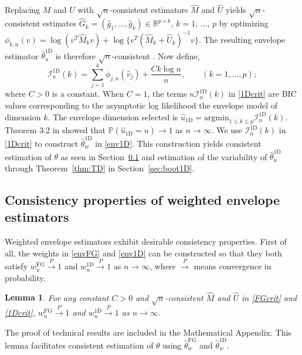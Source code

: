 \documentclass{article}\usepackage[]{graphicx}\usepackage[]{color}
\newcommand{\R}{\mathbb{R}}
\newcommand{\Prob}{\mathbb{P}}
\newcommand{\Mhat}{\widehat{M}}
\newcommand{\Uhat}{\widehat{U}}
\newcommand{\TD}{\widehat{\theta}^{\text{1D}}}
\newcommand{\Ghat}{\widehat{G}}
\newcommand{\ghat}{\widehat{g}}
\newcommand{\rootn}{\sqrt{n}}
\newcommand{\EnvwFG}{\widehat{\theta}^{\text{FG}}_w}
\newcommand{\EnvwoneD}{\widehat{\theta}^{\text{1D}}_w}
\newcommand{\IoneD}{\mathcal{I}_n^{\text{1D}}}
\newcommand{\uoneD}{\hat{u}_{\text{1D}}}
\newcommand{\wFG}{w^{\text{FG}}}
\newcommand{\woneD}{w^{\text{1D}}}
\newtheorem{lem}{Lemma}
\begin{document}
Replacing $M$ and $U$ with $\rootn$-consistent estimators $\Mhat$ and $\Uhat$ yields $\rootn$-consistent estimates $\Ghat_k = \left(\ghat_1, \ldots, \ghat_k\right) \in \R^{p \times k}$, $k = 1$, $\ldots$, $p$ by optimizing
$
  \phi_{k,n}(v) = \log(v^T \Mhat_k v) + \log\{v^T(\Mhat_k + \Uhat_k)^{-1} v\}. 
$
The resulting envelope estimator $\TD_u$ is therefore $\rootn$-consistent \citep{found}.
Now define,
\begin{equation}
  \IoneD(k) = \sum_{j=1}^k \phi_{j,n}(\hat{v}_j) + \frac{Ck\log{n}}{n}, 
  \qquad 
  (k = 1, \ldots, p);
\label{1Dcrit}
\end{equation}
where $C > 0$ is a constant. When $C = 1$, the terms $n\IoneD(k)$ in \eqref{1Dcrit} are BIC values corresponding to the asymptotic log likelihood the envelope model of dimension $k$. The envelope dimension selected is $\uoneD = \text{argmin}_{1\leq k\leq p} \IoneD(k)$. Theorem 3.2 in \citet{zhangmai} showed that $\Prob(\uoneD = u) \to 1$ as $n \to \infty$. %
We use $\IoneD(k)$ in \eqref{1Dcrit} to construct $\EnvwoneD$ in \eqref{env1D}. This construction yields consistent estimation of $\theta$ as seen in Section~\ref{consisprop} and  estimation of the variability of $\TD_u$ through Theorem~\ref{thm:TD} in Section~\ref{sec:boot1D}. 

\subsection{Consistency properties of weighted envelope estimators}
\label{consisprop}

Weighted envelope estimators exhibit desirable consistency properties. First of all, the weights in \eqref{envFG} and \eqref{env1D} can be constructed so that they both satisfy $\wFG_u \overset{P}{\to} 1$ and $\woneD_u \overset{P}{\to} 1$ as $n \to \infty$, where $\overset{P}{\to}$ means convergence in probability. 

\begin{lem}
For any constant $C > 0$ and $\sqrt{n}$-consistent $\Mhat$ and $\Uhat$ in \eqref{FGcrit} and \eqref{1Dcrit}, $\wFG_u \overset{P}{\to} 1$ and $\woneD_u \overset{P}{\to} 1$ as $n \to \infty$.
\label{lem:weights}
\end{lem}

The proof of technical results are included in the Mathematical Appendix. This lemma facilitates consistent estimation of $\theta$ using $\EnvwFG$ and $\EnvwoneD$.
\end{document}
